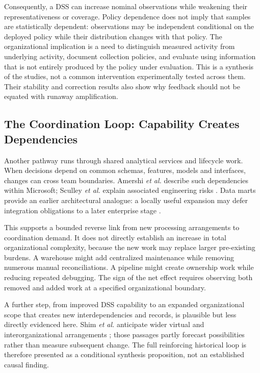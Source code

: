 \documentclass[journal]{IEEEtran}
\begin{document}
Consequently, a DSS can increase nominal observations while weakening their representativeness or coverage. Policy dependence does not imply that samples are statistically dependent: observations may be independent conditional on the deployed policy while their distribution changes with that policy. The organizational implication is a need to distinguish measured activity from underlying activity, document collection policies, and evaluate using information that is not entirely produced by the policy under evaluation. This is a synthesis of the studies, not a common intervention experimentally tested across them. Their stability and correction results also show why feedback should not be equated with runaway amplification.

\subsection{The Coordination Loop: Capability Creates Dependencies}
Another pathway runs through shared analytical services and lifecycle work. When decisions depend on common schemas, features, models and interfaces, changes can cross team boundaries. Amershi \emph{et al.} describe such dependencies within Microsoft; Sculley \emph{et al.} explain associated engineering risks \cite{amershi2019,sculley2015}. Data marts provide an earlier architectural analogue: a locally useful expansion may defer integration obligations to a later enterprise stage \cite{chaudhuri1997}.

This supports a bounded reverse link from new processing arrangements to coordination demand. It does not directly establish an increase in total organizational complexity, because the new work may replace larger pre-existing burdens. A warehouse might add centralized maintenance while removing numerous manual reconciliations. A pipeline might create ownership work while reducing repeated debugging. The sign of the net effect requires observing both removed and added work at a specified organizational boundary.

A further step, from improved DSS capability to an expanded organizational scope that creates new interdependencies and records, is plausible but less directly evidenced here. Shim \emph{et al.} anticipate wider virtual and interorganizational arrangements \cite{shim2002}; those passages partly forecast possibilities rather than measure subsequent change. The full reinforcing historical loop is therefore presented as a conditional synthesis proposition, not an established causal finding.
\end{document}
